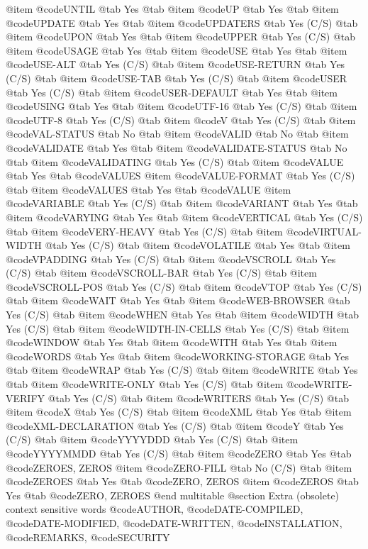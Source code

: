 @item @code{UNTIL} @tab Yes @tab 
@item @code{UP} @tab Yes @tab 
@item @code{UPDATE} @tab Yes @tab 
@item @code{UPDATERS} @tab Yes	(C/S) @tab 
@item @code{UPON} @tab Yes @tab 
@item @code{UPPER} @tab Yes	(C/S) @tab 
@item @code{USAGE} @tab Yes @tab 
@item @code{USE} @tab Yes @tab 
@item @code{USE-ALT} @tab Yes	(C/S) @tab 
@item @code{USE-RETURN} @tab Yes	(C/S) @tab 
@item @code{USE-TAB} @tab Yes	(C/S) @tab 
@item @code{USER} @tab Yes	(C/S) @tab 
@item @code{USER-DEFAULT} @tab Yes @tab 
@item @code{USING} @tab Yes @tab 
@item @code{UTF-16} @tab Yes	(C/S) @tab 
@item @code{UTF-8} @tab Yes	(C/S) @tab 
@item @code{V} @tab Yes	(C/S) @tab 
@item @code{VAL-STATUS} @tab No @tab 
@item @code{VALID} @tab No @tab 
@item @code{VALIDATE} @tab Yes @tab 
@item @code{VALIDATE-STATUS} @tab No @tab 
@item @code{VALIDATING} @tab Yes	(C/S) @tab 
@item @code{VALUE} @tab Yes @tab @code{VALUES}
@item @code{VALUE-FORMAT} @tab Yes	(C/S) @tab 
@item @code{VALUES} @tab Yes @tab @code{VALUE}
@item @code{VARIABLE} @tab Yes	(C/S) @tab 
@item @code{VARIANT} @tab Yes @tab 
@item @code{VARYING} @tab Yes @tab 
@item @code{VERTICAL} @tab Yes	(C/S) @tab 
@item @code{VERY-HEAVY} @tab Yes	(C/S) @tab 
@item @code{VIRTUAL-WIDTH} @tab Yes	(C/S) @tab 
@item @code{VOLATILE} @tab Yes @tab 
@item @code{VPADDING} @tab Yes	(C/S) @tab 
@item @code{VSCROLL} @tab Yes	(C/S) @tab 
@item @code{VSCROLL-BAR} @tab Yes	(C/S) @tab 
@item @code{VSCROLL-POS} @tab Yes	(C/S) @tab 
@item @code{VTOP} @tab Yes	(C/S) @tab 
@item @code{WAIT} @tab Yes @tab 
@item @code{WEB-BROWSER} @tab Yes	(C/S) @tab 
@item @code{WHEN} @tab Yes @tab 
@item @code{WIDTH} @tab Yes	(C/S) @tab 
@item @code{WIDTH-IN-CELLS} @tab Yes	(C/S) @tab 
@item @code{WINDOW} @tab Yes @tab 
@item @code{WITH} @tab Yes @tab 
@item @code{WORDS} @tab Yes @tab 
@item @code{WORKING-STORAGE} @tab Yes @tab 
@item @code{WRAP} @tab Yes	(C/S) @tab 
@item @code{WRITE} @tab Yes @tab 
@item @code{WRITE-ONLY} @tab Yes	(C/S) @tab 
@item @code{WRITE-VERIFY} @tab Yes	(C/S) @tab 
@item @code{WRITERS} @tab Yes	(C/S) @tab 
@item @code{X} @tab Yes	(C/S) @tab 
@item @code{XML} @tab Yes @tab 
@item @code{XML-DECLARATION} @tab Yes	(C/S) @tab 
@item @code{Y} @tab Yes	(C/S) @tab 
@item @code{YYYYDDD} @tab Yes	(C/S) @tab 
@item @code{YYYYMMDD} @tab Yes	(C/S) @tab 
@item @code{ZERO} @tab Yes @tab @code{ZEROES, ZEROS}
@item @code{ZERO-FILL} @tab No	(C/S) @tab 
@item @code{ZEROES} @tab Yes @tab @code{ZERO, ZEROS}
@item @code{ZEROS} @tab Yes @tab @code{ZERO, ZEROES}
@end multitable
@section Extra (obsolete) context sensitive words
@code{AUTHOR}, @code{DATE-COMPILED}, @code{DATE-MODIFIED}, @code{DATE-WRITTEN}, @code{INSTALLATION}, @code{REMARKS}, @code{SECURITY}

